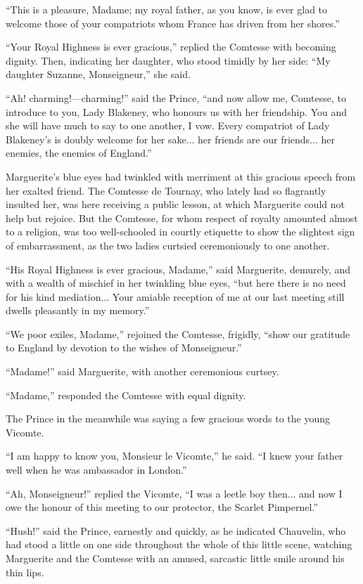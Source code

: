 \documentclass[paper=5.5in:8.5in,BCOR=7mm,twoside,DIV=calc,12pt,usegeometry,chapterprefix,endperiod,headings=big]{scrbook}
\begin{document}
\enquote{This is a pleasure, Madame; my royal father, as you know, is ever glad to welcome those of your compatriots whom France has driven from her shores.}

\enquote{Your Royal Highness is ever gracious,} replied the Comtesse with becoming dignity. Then, indicating her daughter, who stood timidly by her side: \enquote{My daughter Suzanne, Monseigneur,} she said.

\enquote{Ah! charming!---charming!} said the Prince, \enquote{and now allow me, Comtesse, to introduce to you, Lady Blakeney, who honours us with her friendship. You and she will have much to say to one another, I vow. Every compatriot of Lady Blakeney's is doubly welcome for her sake... her friends are our friends... her enemies, the enemies of England.}

Marguerite's blue eyes had twinkled with merriment at this gracious speech from her exalted friend. The Comtesse de Tournay, who lately had so flagrantly insulted her, was here receiving a public lesson, at which Marguerite could not help but rejoice. But the Comtesse, for whom respect of royalty amounted almost to a religion, was too well-schooled in courtly etiquette to show the slightest sign of embarrassment, as the two ladies curtsied ceremoniously to one another.

\enquote{His Royal Highness is ever gracious, Madame,} said Marguerite, demurely, and with a wealth of mischief in her twinkling blue eyes, \enquote{but here there is no need for his kind mediation... Your amiable reception of me at our last meeting still dwells pleasantly in my memory.}

\enquote{We poor exiles, Madame,} rejoined the Comtesse, frigidly, \enquote{show our gratitude to England by devotion to the wishes of Monseigneur.}

\enquote{Madame!} said Marguerite, with another ceremonious curtsey.

\enquote{Madame,} responded the Comtesse with equal dignity.

The Prince in the meanwhile was saying a few gracious words to the young Vicomte.

\enquote{I am happy to know you, Monsieur le Vicomte,} he said. \enquote{I knew your father well when he was ambassador in London.}

\enquote{Ah, Monseigneur!} replied the Vicomte, \enquote{I was a leetle boy then... and now I owe the honour of this meeting to our protector, the Scarlet Pimpernel.}

\enquote{Hush!} said the Prince, earnestly and quickly, as he indicated Chauvelin, who had stood a little on one side throughout the whole of this little scene, watching Marguerite and the Comtesse with an amused, sarcastic little smile around his thin lips.
\end{document}
